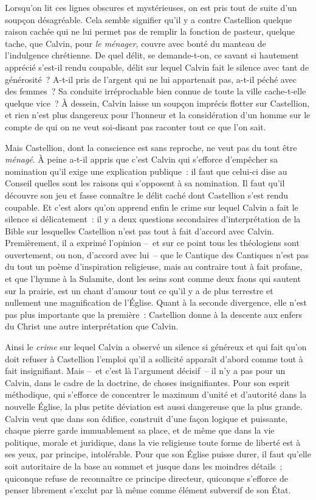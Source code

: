 \documentclass[french,twoside]{book} %
\begin{document}
\noindent Lorsqu’on lit ces lignes obscures et mystérieuses, on est pris tout de suite d’un soupçon désagréable. Cela semble signifier qu’il y a contre Castellion quelque raison cachée qui ne lui permet pas de remplir la fonction de pasteur, quelque tache, que Calvin, pour \emph{le ménager}, couvre avec bonté du manteau de l’indulgence chrétienne. De quel délit, se demande-t-on, ce savant si hautement apprécié s’est-il rendu coupable, délit sur lequel Calvin fait le silence avec tant de générosité ? A-t-il pris de l’argent qui ne lui appartenait pas, a-t-il péché avec des femmes ? Sa conduite irréprochable bien connue de toute la ville cache-t-elle quelque vice ? À dessein, Calvin laisse un soupçon imprécis flotter sur Castellion, et rien n’est plus dangereux pour l’honneur et la considération d’un homme sur le compte de qui on ne veut soi-disant pas raconter tout ce que l’on sait.\par
Mais Castellion, dont la conscience est sans reproche, ne veut pas du tout être \emph{ménagé}. À peine a-t-il appris que c’est Calvin qui s’efforce d’empêcher sa nomination qu’il exige une explication publique : il faut que celui-ci dise au Conseil quelles sont les raisons qui s’opposent à sa nomination. Il faut qu’il découvre son jeu et fasse connaître le délit caché dont Castellion s’est rendu coupable. Et c’est alors qu’on apprend enfin le crime sur lequel Calvin a fait le silence si délicatement : il y a deux questions secondaires d’interprétation de la Bible sur lesquelles Castellion n’est pas tout à fait d’accord avec Calvin. Premièrement, il a exprimé l’opinion – et sur ce point tous les théologiens sont ouvertement, ou non, d’accord avec lui – que le Cantique des Cantiques n’est pas du tout un poème d’inspiration religieuse, mais au contraire tout à fait profane, et que l’hymne à la Sulamite, dont les seins sont comme deux faons qui sautent sur la prairie, est un chant d’amour tout ce qu’il y a de plus terrestre et nullement une magnification de l’Église. Quant à la seconde divergence, elle n’est pas plus importante que la première : Castellion donne à la descente aux enfers du Christ une autre interprétation que Calvin.\par
Ainsi le \emph{crime} sur lequel Calvin a observé un silence si généreux et qui fait qu’on doit refuser à Castellion l’emploi qu’il a sollicité apparaît d’abord comme tout à fait insignifiant. Mais – et c’est là l’argument décisif – il n’y a pas pour un Calvin, dans le cadre de la doctrine, de choses insignifiantes. Pour son esprit méthodique, qui s’efforce de concentrer le maximum d’unité et d’autorité dans la nouvelle Église, la plus petite déviation est aussi dangereuse que la plus grande. Calvin veut que dans son édifice, construit d’une façon logique et puissante, chaque pierre garde immuablement sa place, et de même que dans la vie politique, morale et juridique, dans la vie religieuse toute forme de liberté est à ses yeux, par principe, intolérable. Pour que son Église puisse durer, il faut qu’elle soit autoritaire de la base au sommet et jusque dans les moindres détails ; quiconque refuse de reconnaître ce principe directeur, quiconque s’efforce de penser librement s’exclut par là même comme élément subversif de son État.\par
\end{document}
